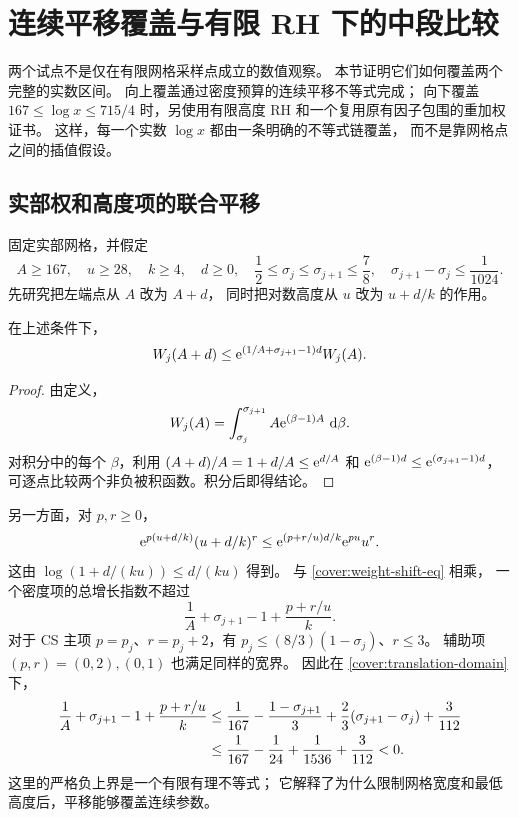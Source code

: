 \section{连续平移覆盖与有限 RH 下的中段比较}\label{sec:coverage}

两个试点不是仅在有限网格采样点成立的数值观察。
本节证明它们如何覆盖两个完整的实数区间。
向上覆盖通过密度预算的连续平移不等式完成；
向下覆盖 $167\leq\log x\leq715/4$ 时，另使用有限高度 RH
和一个复用原有因子包围的重加权证书。
这样，每一个实数 $\log x$ 都由一条明确的不等式链覆盖，
而不是靠网格点之间的插值假设。

\subsection{实部权和高度项的联合平移}

固定实部网格，并假定
\begin{equation}\label{cover:translation-domain}
 A\geq167,\quad u\geq28,\quad k\geq4,\quad d\geq0,\quad
 \frac12\leq\sigma_j\leq\sigma_{j+1}\leq\frac78,\quad
 \sigma_{j+1}-\sigma_j\leq\frac1{1024}.
\end{equation}
先研究把左端点从 $A$ 改为 $A+d$，
同时把对数高度从 $u$ 改为 $u+d/k$ 的作用。

\begin{lemma}[权的平移界]\label{cover:weight-shift}
在上述条件下，
\begin{equation}\label{cover:weight-shift-eq}
 W_j(A+d)\leq
  \mathrm e^{(1/A+\sigma_{j+1}-1)d}W_j(A).
\end{equation}
\end{lemma}
\begin{proof}
由定义，
\[
 W_j(A)=\int_{\sigma_j}^{\sigma_{j+1}}
                         A\mathrm e^{(\beta-1)A}\,\,\mathrm d\beta .
\]
对积分中的每个 $\beta$，利用
$(A+d)/A=1+d/A\leq\mathrm e^{d/A}$ 和
$\mathrm e^{(\beta-1)d}\leq\mathrm e^{(\sigma_{j+1}-1)d}$，
可逐点比较两个非负被积函数。积分后即得结论。
\end{proof}

另一方面，对 $p,r\geq0$，
\begin{equation}\label{cover:height-rate}
 \mathrm e^{p(u+d/k)}(u+d/k)^r
 \leq
 \mathrm e^{(p+r/u)d/k}\mathrm e^{pu}u^r.
\end{equation}
这由 $\log(1+d/(ku))\leq d/(ku)$ 得到。
与 \eqref{cover:weight-shift-eq} 相乘，
一个密度项的总增长指数不超过
\[
 \frac1A+\sigma_{j+1}-1+\frac{p+r/u}{k}.
\]
对于 CS 主项 $p=p_j$、$r=p_j+2$，有
$p_j\leq(8/3)(1-\sigma_j)$、$r\leq3$。
辅助项 $(p,r)=(0,2),(0,1)$ 也满足同样的宽界。
因此在 \eqref{cover:translation-domain} 下，
\begin{align}
 \frac1A+\sigma_{j+1}-1+\frac{p+r/u}{k}
 &\leq\frac1{167}
       -\frac{1-\sigma_{j+1}}3
       +\frac23(\sigma_{j+1}-\sigma_j)+\frac3{112}\notag\\
 &\leq\frac1{167}-\frac1{24}+\frac1{1536}+\frac3{112}<0.
                                                     \label{cover:rate-negative}
\end{align}
这里的严格负上界是一个有限有理不等式；
它解释了为什么限制网格宽度和最低高度后，平移能够覆盖连续参数。

